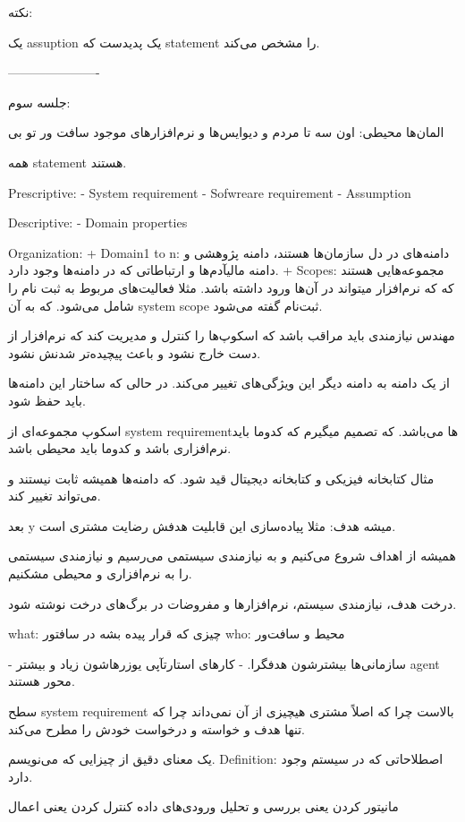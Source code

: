 نکته:

یک assuption یک پدیدست که statement را مشخص می‌کند.


----------------------

جلسه سوم:

المان‌ها 
محیطی: اون سه تا مردم و دیوایس‌ها و نرم‌افزار‌های موجود
سافت ور تو بی

همه statement هستند.

Prescriptive:
- System requirement
- Sofwreare requirement
- Assumption

Descriptive:
- Domain properties

Organization:
+ Domain1 to n: دامنه‌های در دل سازمان‌ها هستند، دامنه پژوهشی و دامنه مالیآدم‌ها
و ارتباطاتی که در دامنه‌ها وجود دارد.
+ Scopes: مجموعه‌هایی هستند که که نرم‌افزار میتواند در آن‌ها ورود داشته باشد.
مثلا فعالیت‌های مربوط به ثبت نام را شامل می‌شود. که به آن system scope ثبت‌نام
گفته می‌شود.

مهندس نیازمندی باید مراقب باشد که اسکوپ‌ها را کنترل و مدیریت کند که نرم‌افزار از
دست خارج نشود و باعث پیچیده‌تر شدنش نشود.

از یک دامنه به دامنه دیگر این ویژگی‌های تغییر می‌کند. در حالی که ساختار این
دامنه‌ها باید حفظ شود.

اسکوپ مجموعه‌ای از system requirement‌ها می‌باشد. که تصمیم میگیرم که کدوما باید
نرم‌افزاری باشد و کدوما باید محیطی باشد.

مثال کتابخانه فیزیکی و کتابخانه دیجیتال قید شود. که دامنه‌ها همیشه ثابت نیستند و
می‌تواند تغییر کند.

بعد y میشه هدف: مثلا پیاده‌سازی این قابلیت هدفش رضایت مشتری است.

همیشه از اهداف شروع می‌کنیم و به نیازمندی سیستمی می‌رسیم و نیازمندی سیستمی را به
نرم‌افزاری و محیطی مشکنیم.

درخت هدف، نیازمندی سیستم، نرم‌افزار‌ها و مفروضات در برگ‌های درخت نوشته شود.

what: چیزی که قرار پیده بشه در سافتور 
who: محیط و سافت‌ور

- سازمانی‌ها بیشترشون هدفگرا.
- کار‌های استارتآپی یوزر‌هاشون زیاد و بیشتر agent محور هستند.

سطح system requirement بالاست چرا که اصلاً مشتری هیچیزی از آن نمی‌داند چرا که
تنها هدف و خواسته و درخواست خودش را مطرح می‌کند.

یک معنای دقیق از چیزایی که می‌نویسم.
Definition: اصطلاحاتی که در سیستم وجود دارد.


مانیتور کردن یعنی بررسی و تحلیل ورودی‌های داده
کنترل کردن یعنی اعمال


